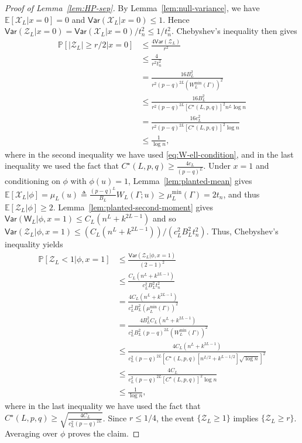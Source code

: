 \documentclass[12pt]{article}
\newcommand{\bE}{\mathbb{E}}
\newcommand {\pr} {\mathbb{P}}
\newcommand{\p}[1]{\left(#1\right)}
\newcommand{\pp}[1]{\left[#1\right]}
\newcommand{\s}[1]{\mathsf{#1}}
\begin{document}
\begin{proof}[Proof of Lemma~\ref{lem:HP-sep}]
By Lemma~\ref{lem:null-variance}, we have $\bE[\mathscr{X}_L\vert x=0]=0$ and $\s{Var}(\mathscr{X}_L\vert x=0)\le 1$. Hence
$\s{Var}(\mathscr{Z}_L\vert x=0)=\s{Var}(\mathscr{X}_L\vert x=0)/t_n^2\le 1/t_n^2$.
Chebyshev's inequality then gives
\begin{align}
\pr\pp{|\mathscr{Z}_L|\geq r/2\vert x=0}&\leq\frac{4\s{Var}(\mathscr{Z}_L)}{r^2}\\
&\leq\frac{4}{r^2t_n^2}\\
&=  \frac{16B_L^2}{r^2(p-q)^{2L}(W_L^{\min}(\Gamma))^2}\\
&\leq \frac{16B_L^2}{r^2(p-q)^{2L}[C^\star(L,p,q)]^2n^{L}\log n}\\
& = \frac{16c_L^2}{r^2(p-q)^{2L}[C^\star(L,p,q)]^2\log n}\\
&\leq\frac{1}{\log n},
\end{align}
where in the second inequality we have used \eqref{eq:W-ell-condition}, and in the last inequality we used the fact that $C^\star(L,p,q)\geq \frac{4c_L}{(p-q)^L}$. Under $x=1$ and conditioning on $\phi$ with $\phi(u)=1$, Lemma~\ref{lem:planted-mean} gives
$\bE[\mathscr{X}_L\vert \phi]=\mu_L(u)\triangleq \frac{(p-q)^L}{B_L} W_L(\Gamma;u)\ge \mu_L^{\min}(\Gamma)=2t_n$, and thus $\bE[\mathscr{Z}_L\vert \phi]\ge 2$. Lemma~\ref{lem:planted-second-moment} gives $\s{Var}\p{\s{W}_L\vert \phi,x=1}\leq C_L\p{n^{L}+k^{2L-1}}$ and so $\s{Var}(\mathscr{Z}_L\vert \phi,x=1)\leq (C_L\p{n^{L}+k^{2L-1}})/(c_L^2B_L^2t_n^2)$. Thus, Chebyshev's inequality yields
\begin{align}
\pr\pp{\mathscr{Z}_L<1\vert \phi,x=1}&\leq\frac{\s{Var}(\mathscr{Z}_L\vert \phi,x=1)}{(2-1)^2}\\
&\leq \frac{C_L\p{n^{L}+k^{2L-1}}}{c_L^2B_L^2t_n^2}\\
&= \frac{4C_L\p{n^{L}+k^{2L-1}}}{c_L^2B_L^2(\mu_L^{\min}(\Gamma))^2}\\
& = \frac{4B_L^2C_L\p{n^{L}+k^{2L-1}}}{c_L^2B_L^2(p-q)^{2L}(W_L^{\min}(\Gamma))^2}\\
&\leq \frac{4C_L\p{n^{L}+k^{2L-1}}}{c_L^2(p-q)^{2L}\pp{C^\star(L,p,q)\pp{n^{L/2}+k^{L-1/2}}\sqrt{\log n}}^2}\\
&\leq \frac{4C_L}{c_L^2(p-q)^{2L}[C^\star(L,p,q)]^2\log n}\\
&\leq\frac{1}{\log n},
\end{align}
where in the last inequality we have used the fact that $C^\star(L,p,q)\geq \sqrt{\frac{4C_L}{c_L^2(p-q)^{2L}}}$. Since $r\le 1/4$, the event $\{\mathscr{Z}_L\ge 1\}$ implies $\{\mathscr{Z}_L\ge r\}$. Averaging over $\phi$ proves the claim.
\end{proof}
\end{document}
